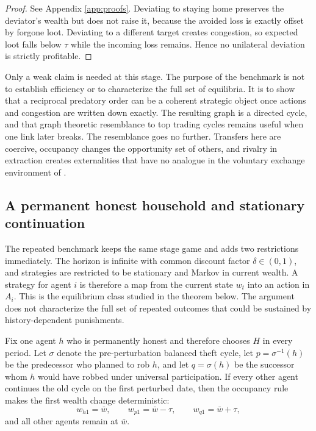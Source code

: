 \begin{proof}
See Appendix \ref{app:proofs}. Deviating to staying home preserves the deviator's wealth but does not raise it, because the avoided loss is exactly offset by forgone loot. Deviating to a different target creates congestion, so expected loot falls below $\tau$ while the incoming loss remains. Hence no unilateral deviation is strictly profitable.
\end{proof}

Only a weak claim is needed at this stage. The purpose of the benchmark is not to establish efficiency or to characterize the full set of equilibria. It is to show that a reciprocal predatory order can be a coherent strategic object once actions and congestion are written down exactly. The resulting graph is a directed cycle, and that graph theoretic resemblance to top trading cycles remains useful when one link later breaks. The resemblance goes no further. Transfers here are coercive, occupancy changes the opportunity set of others, and rivalry in extraction creates externalities that have no analogue in the voluntary exchange environment of \citet{shapley_scarf_1974}.

\subsection{A permanent honest household and stationary continuation}

The repeated benchmark keeps the same stage game and adds two restrictions immediately. The horizon is infinite with common discount factor $\delta \in (0,1)$, and strategies are restricted to be stationary and Markov in current wealth. A strategy for agent $i$ is therefore a map from the current state $w_t$ into an action in $A_i$. This is the equilibrium class studied in the theorem below. The argument does not characterize the full set of repeated outcomes that could be sustained by history-dependent punishments.

Fix one agent $h$ who is permanently honest and therefore chooses $H$ in every period. Let $\sigma$ denote the pre-perturbation balanced theft cycle, let $p = \sigma^{-1}(h)$ be the predecessor who planned to rob $h$, and let $q = \sigma(h)$ be the successor whom $h$ would have robbed under universal participation. If every other agent continues the old cycle on the first perturbed date, then the occupancy rule makes the first wealth change deterministic:
\begin{equation}
w_{h1} = \bar{w}, \qquad w_{p1} = \bar{w} - \tau, \qquad w_{q1} = \bar{w} + \tau,
\label{eq:first-night-accounting}
\end{equation}
and all other agents remain at $\bar{w}$.

